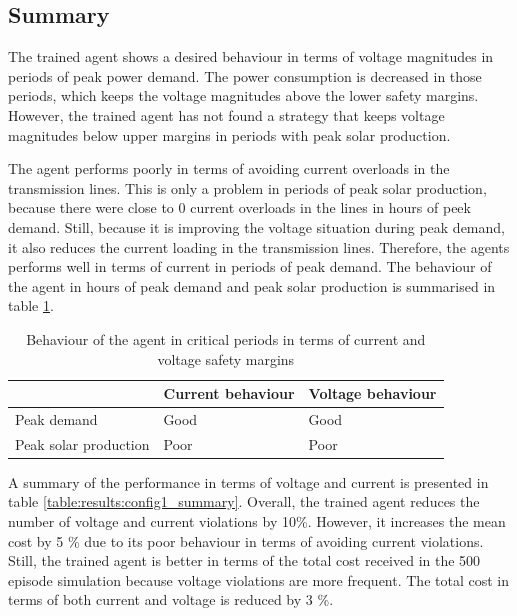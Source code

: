 \documentclass[class=book, crop=false, 11pt]{standalone}
\begin{document}
\subsection{Summary}
The trained agent shows a desired behaviour in terms of voltage magnitudes in periods of peak power demand. The power consumption is decreased in those periods, which keeps the voltage magnitudes above the lower safety margins. However, the trained agent has not found a strategy that keeps voltage magnitudes below upper margins in periods with peak solar production.

The agent performs poorly in terms of avoiding current overloads in the transmission lines. This is only a problem in periods of peak solar production, because there were close to 0 current overloads in the lines in hours of peek demand. Still, because it is improving the voltage situation during peak demand, it also reduces the current loading in the transmission lines. Therefore, the agents performs well in terms of current in periods of peak demand. The behaviour of the agent in hours of peak demand and peak solar production is summarised in table \ref{table:results:config1_behaviour}.

\begin{table}[h]
\center
\caption{Behaviour of the agent in critical periods in terms of current and voltage safety margins}
\begin{tabular}{l|ll}
                      & Current behaviour     & Voltage behaviour \\
\hline
Peak demand           & Good & Good              \\
Peak solar production & Poor                  & Poor \\
\hline
\end{tabular}
\label{table:results:config1_behaviour}
\end{table}
 A summary of the performance in terms of voltage and current is presented in table \ref{table:results:config1_summary}. Overall, the trained agent reduces the number of voltage and current violations by 10\%. However, it increases the mean cost by 5 \% due to its poor behaviour in terms of avoiding current violations. Still, the trained agent is better in terms of the total cost received in the 500 episode simulation because voltage violations are more frequent. The total cost in terms of both current and voltage is reduced by 3 \%.
\end{document}
